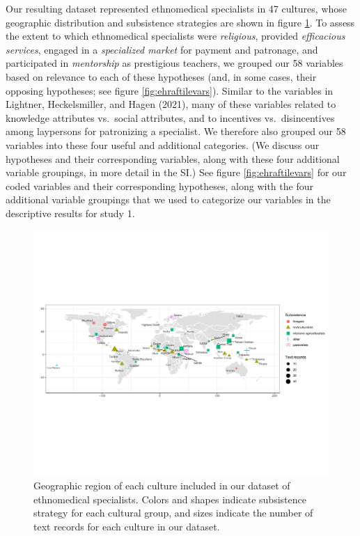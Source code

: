 \documentclass[
  11pt,
]{article}
\begin{document}
Our resulting dataset represented ethnomedical specialists in 47 cultures, whose geographic distribution and subsistence strategies are shown in figure \ref{fig:worldmap}. To assess the extent to which ethnomedical specialists were \emph{religious}, provided \emph{efficacious services}, engaged in a \emph{specialized market} for payment and patronage, and participated in \emph{mentorship} as prestigious teachers, we grouped our 58 variables based on relevance to each of these hypotheses (and, in some cases, their opposing hypotheses; see figure \ref{fig:ehraftilevars}). Similar to the variables in Lightner, Heckelsmiller, and Hagen (2021), many of these variables related to knowledge attributes vs.~social attributes, and to incentives vs.~disincentives among laypersons for patronizing a specialist. We therefore also grouped our 58 variables into these four useful and additional categories. (We discuss our hypotheses and their corresponding variables, along with these four additional variable groupings, in more detail in the SI.) See figure \ref{fig:ehraftilevars} for our coded variables and their corresponding hypotheses, along with the four additional variable groupings that we used to categorize our variables in the descriptive results for study 1.

\begin{landscape}

\begin{figure}[p]

{\centering \includegraphics{magic-healers-article2_files/figure-latex/worldmap-1} 

}

\caption{Geographic region of each culture included in our dataset of ethnomedical specialists. Colors and shapes indicate subsistence strategy for each cultural group, and sizes indicate the number of text records for each culture in our dataset.}\label{fig:worldmap}
\end{figure}

\end{landscape}
\end{document}
